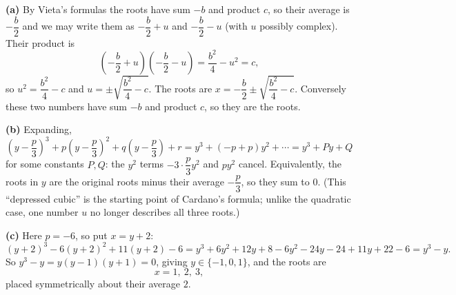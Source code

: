 \textbf{(a)} By Vieta's formulas the roots have sum $-b$ and product $c$, so their average is $-\dfrac b2$ and we may write them as $-\dfrac b2+u$ and $-\dfrac b2-u$ (with $u$ possibly complex). Their product is
\[\left(-\dfrac b2+u\right)\left(-\dfrac b2-u\right)=\dfrac{b^2}{4}-u^2=c,\]
so $u^2=\dfrac{b^2}{4}-c$ and $u=\pm\sqrt{\dfrac{b^2}{4}-c}$. The roots are $x=-\dfrac b2\pm\sqrt{\dfrac{b^2}{4}-c}$. Conversely these two numbers have sum $-b$ and product $c$, so they are the roots.

\textbf{(b)} Expanding,
\[\left(y-\dfrac p3\right)^3+p\left(y-\dfrac p3\right)^2+q\left(y-\dfrac p3\right)+r=y^3+\left(-p+p\right)y^2+\cdots=y^3+Py+Q\]
for some constants $P,Q$: the $y^2$ terms $-3\cdot\dfrac p3y^2$ and $py^2$ cancel. Equivalently, the roots in $y$ are the original roots minus their average $-\dfrac p3$, so they sum to $0$. (This ``depressed cubic'' is the starting point of Cardano's formula; unlike the quadratic case, one number $u$ no longer describes all three roots.)

\textbf{(c)} Here $p=-6$, so put $x=y+2$:
\[(y+2)^3-6(y+2)^2+11(y+2)-6=y^3+6y^2+12y+8-6y^2-24y-24+11y+22-6=y^3-y.\]
So $y^3-y=y(y-1)(y+1)=0$, giving $y\in\{-1,0,1\}$, and the roots are
\[\boxed{x=1,\ 2,\ 3},\]
placed symmetrically about their average $2$.
